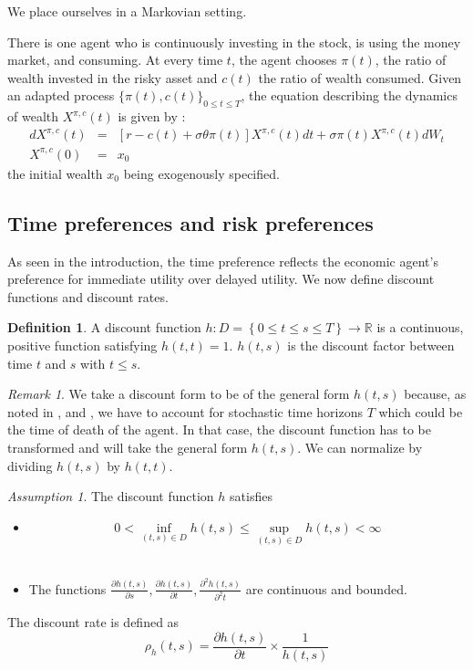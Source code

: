 \documentclass[11pt, psfig]{article}
\theoremstyle{definition}
\newtheorem{definition}[theorem]{Definition}
\theoremstyle{remark}
\newtheorem{remark}[theorem]{Remark}
\newtheorem{assumption}[theorem]{Assumption}
\numberwithin{equation}{section}
\def\sR{\mathbb{R}}
\def\sR{\mathbb{R}}
\newcommand{\be}{\begin{equation}}
\newcommand{\ee}{\end{equation}}
\begin{document}
We place ourselves in a Markovian setting.


There is one agent who is continuously investing in the stock, is using 
the money market, and consuming.
At every time $t$, the agent chooses $\pi(t)$, the ratio of wealth invested in the
risky asset and  $c(t)$ the ratio of wealth consumed. Given an adapted process $\{\pi (t),c(t)\}_{0\leq t\leq T}$, the
equation describing the dynamics of wealth ${X^{\pi ,c}(t)}$ is given by : 
\begin{eqnarray}\label{eq121_3}
dX^{\pi ,c}(t) &=&[r-c(t)+\sigma\theta\pi(t)]X^{\pi ,c}(t)dt+\sigma\pi
(t)X^{\pi,c}(t)dW_t   \\
X^{\pi ,c}(0) &=&x_0 \nonumber
\end{eqnarray}%
the initial wealth $x_0$ being exogenously specified.

\subsection{Time preferences and risk preferences }
As seen in the introduction, the time preference reflects the economic agent's preference for immediate utility over delayed utility. We now define discount functions and discount rates.
\begin{definition}
A discount function $h:D=\left\{0\leq t\leq s\leq T\right\}\rightarrow \sR$ is a continuous, positive function satisfying $h(t,t)=1$.
$h(t,s)$ is the discount factor between time $t$ and $s$ with $t\leq s$. 
\end{definition}
\begin{remark}
We take a discount form to be of the general form $h(t,s)$ because, as noted in \cite{Pi_Zh1}, \cite{Mb_Pi1} and  \cite{Ek_Mb_Pi1}, we have to account for stochastic time horizons $T$ which could be the time of death of the agent.
In that case, the discount function has to be transformed and will take the general form $h(t,s)$.
We can normalize by dividing $h(t,s)$ by $h(t,t)$.
\end{remark}
\begin{assumption}
The discount function $h$ satisfies \begin{itemize}
\item \be
0< \inf_{(t,s)\in D} h(t,s) \leq \sup_{(t,s)\in D} h(t,s) <\infty \ee  \\
\item The functions  $\frac{\partial h(t,s)}{\partial s}, \frac{\partial h(t,s)}{\partial t}, \frac{\partial^2 h(t,s)}{\partial^2 t}$ are continuous and bounded.
\end{itemize}

The discount rate is defined as
\begin{equation}\label{eq121_5}
\rho_{h}(t,s) = \frac{\partial h(t,s)}{\partial t}\times \frac{1}{h(t,s)}
\end{equation}


\end{assumption}
\end{document}
